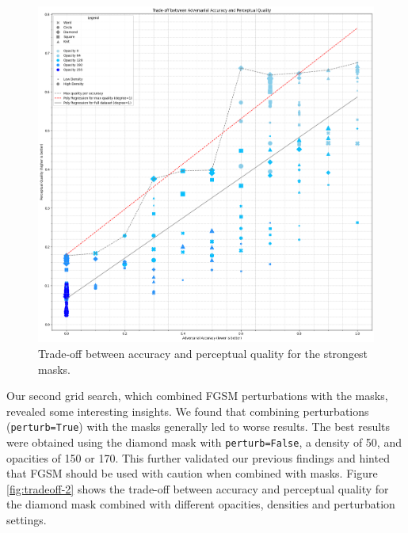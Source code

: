 \documentclass[a4paper, oneside]{discothesis}
\begin{document}
\begin{figure}
	\centering
	\includegraphics[width=1\columnwidth]{figures/tradeoff-1.png}
	\caption{Trade-off between accuracy and perceptual quality for the strongest masks.}
	\label{fig:tradeoff-1}
\end{figure}

Our second grid search, which combined FGSM perturbations with the masks, revealed some interesting insights. We found that combining perturbations (\texttt{perturb=True}) with the masks generally led to worse results. The best results were obtained using the diamond mask with \texttt{perturb=False}, a density of 50, and opacities of 150 or 170. This further validated our previous findings and hinted that FGSM should be used with caution when combined with masks. Figure \ref{fig:tradeoff-2} shows the trade-off between accuracy and perceptual quality for the diamond mask combined with different opacities, densities and perturbation settings.
\end{document}
